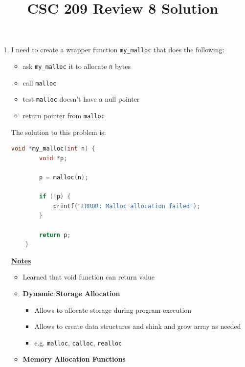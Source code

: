 \documentclass[12pt]{article}
\begin{document}
\title{CSC 209 Review 8 Solution}
\maketitle

\bigskip

\begin{enumerate}[1.]
    \item

    I need to create a wrapper function \texttt{my\_malloc} that does the following:

    \bigskip

    \begin{itemize}
        \item ask \texttt{my\_malloc} it to allocate \texttt{n} bytes
        \item call \texttt{malloc}
        \item test \texttt{malloc} doesn't have a null pointer
        \item return pointer from \texttt{malloc}
    \end{itemize}

    \bigskip

    The solution to this problem is:

\begin{lstlisting}[language=c]
    void *my_malloc(int n) {
        void *p;

        p = malloc(n);

        if (!p) {
            printf("ERROR: Malloc allocation failed");
        }

        return p;
    }
\end{lstlisting}

    \underline{\textbf{Notes}}

    \begin{itemize}
        \item Learned that void function can return value
        \item \textbf{Dynamic Storage Allocation}

        \begin{itemize}
            \item Allows to allocate storage during program execution
            \item Allows to create data structures and shink and grow array as needed
            \item e.g. \texttt{malloc}, \texttt{calloc}, \texttt{realloc}
        \end{itemize}
        \item \textbf{Memory Allocation Functions}


\end{itemize}
\end{enumerate}
\end{document}
